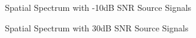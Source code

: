 \documentclass[conference]{IEEEtran}
\begin{document}
		\begin{figure}[H]
			\centerline{}
			\caption{Spatial Spectrum with -10dB SNR Source Signals}
		\end{figure}
		
		\begin{figure}[H]
			\centerline{}
			\caption{Spatial Spectrum with 30dB SNR Source Signals}
		\end{figure}
		
\end{document}
